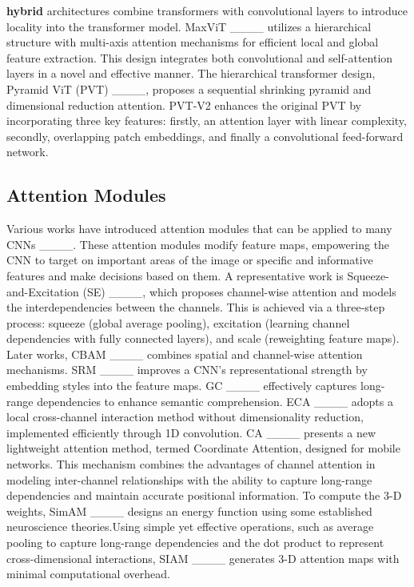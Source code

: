 \textbf{hybrid} architectures combine transformers with convolutional layers to introduce locality into the transformer model. MaxViT ____ utilizes a hierarchical structure with multi-axis attention mechanisms for efficient local and global feature extraction. This design integrates both convolutional and self-attention layers in a novel and effective manner. The hierarchical transformer design, Pyramid ViT (PVT) ____, proposes a sequential shrinking pyramid and dimensional reduction attention. PVT-V2 enhances the original PVT by incorporating three key features: firstly, an attention layer with linear complexity, secondly, overlapping patch embeddings, and finally a convolutional feed-forward network.

\subsection{Attention Modules}

Various works have introduced attention modules that can be applied to many CNNs ____. These attention modules modify feature maps, empowering the CNN to target on important areas of the image or specific and informative features and make decisions based on them. A representative work is Squeeze-and-Excitation (SE) ____, which proposes channel-wise attention and models the interdependencies between the channels. This is achieved via a three-step process: squeeze (global average pooling), excitation (learning channel dependencies with fully connected layers), and scale (reweighting feature maps). Later works, CBAM ____ combines spatial and channel-wise attention mechanisms. SRM ____ improves a CNN's representational strength by embedding styles into the feature maps. GC ____ effectively captures long-range dependencies to enhance semantic comprehension. ECA ____ adopts a local cross-channel interaction method without dimensionality reduction, implemented efficiently through 1D convolution. CA ____ presents a new lightweight attention method, termed Coordinate Attention, designed for mobile networks. This mechanism combines the advantages of channel attention in modeling inter-channel relationships with the ability to capture long-range dependencies and maintain accurate positional information. To compute the 3-D weights, SimAM ____ designs an energy function using some established neuroscience theories.Using simple yet effective operations, such as average pooling to capture long-range dependencies and the dot product to represent cross-dimensional interactions, SIAM ____ generates 3-D attention maps with minimal computational overhead.